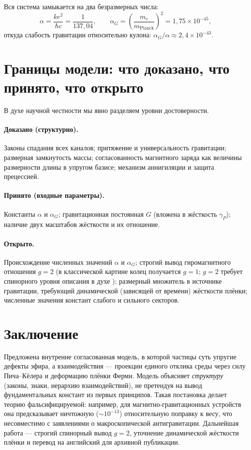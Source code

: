 \documentclass[12pt,a4paper]{article}
\begin{document}
Вся система замыкается на два безразмерных числа:
\begin{equation}
\alpha = \frac{k e^2}{\hbar c}=\frac{1}{137{,}04},\qquad
\alpha_G = \left(\frac{m_e}{m_{\text{Planck}}}\right)^2 = 1{,}75\times10^{-45},
\end{equation}
откуда слабость гравитации относительно кулона: $\alpha_G/\alpha\approx 2{,}4\times10^{-43}$.

\section{Границы модели: что доказано, что принято, что открыто}
\label{sec:limits}
В духе научной честности мы явно разделяем уровни достоверности.

\paragraph{Доказано (структурно).} Законы спадания всех каналов; притяжение и
универсальность гравитации; размерная замкнутость массы; согласованность
магнитного заряда как величины размерности длины в упругом базисе; механизм
аннигиляции и защита прецессией.

\paragraph{Принято (входные параметры).} Константы $\alpha$ и $\alpha_G$;
гравитационная постоянная $G$ (вложена в жёсткость $\gamma_P$); наличие двух
масштабов жёсткости и их отношение.

\paragraph{Открыто.} Происхождение численных значений $\alpha$ и $\alpha_G$;
строгий вывод гиромагнитного отношения $g=2$ (в классической картине колец
получается $g=1$; $g=2$ требует спинорного уровня описания в духе
\cite{osipov2010}); размерный множитель в источнике гравитации, требующий
динамической (зависящей от времени) жёсткости плёнки; численные значения
констант слабого и сильного секторов.

\section{Заключение}
Предложена внутренне согласованная модель, в которой частицы суть упругие
дефекты эфира, а взаимодействия --- проекции единого отклика среды через силу
Пича--Кёлера и деформацию плёнки Ферми. Модель объясняет \emph{структуру}
(законы, знаки, иерархию взаимодействий), не претендуя на вывод фундаментальных
констант из первых принципов. Такая постановка делает теорию фальсифицируемой:
например, для магнитно-гравитационных устройств она предсказывает ничтожную
($\sim\!10^{-13}$) относительную поправку к весу, что несовместимо с заявлениями
о макроскопической антигравитации. Дальнейшая работа --- строгий спинорный вывод
$g=2$, уточнение динамической жёсткости плёнки и перевод на английский для
архивной публикации.
\end{document}

